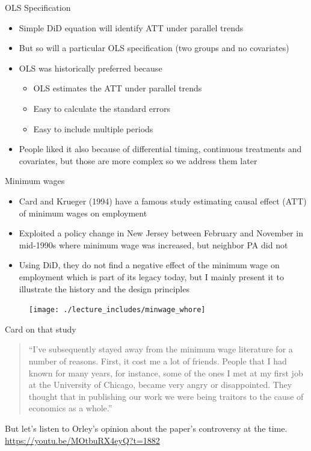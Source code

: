 \documentclass{beamer}
\begin{document}
\begin{frame}{OLS Specification}
	
	\begin{itemize}
	\item Simple DiD equation will identify ATT under parallel trends
	\item But so will a particular OLS specification (two groups and no covariates)
	\item OLS was historically preferred because
		\begin{itemize}
		\item OLS estimates the ATT under parallel trends
		\item Easy to calculate the standard errors
		\item Easy to include multiple periods
		\end{itemize}
	\item People liked it also because of differential timing, continuous treatments and covariates, but those are more complex so we address them later
	\end{itemize}
\end{frame}

\begin{frame}{Minimum wages}

\begin{itemize}
\item Card and Krueger (1994) have a famous study estimating causal effect (ATT) of minimum wages on employment
\item Exploited a policy change in New Jersey between February and November in mid-1990s where minimum wage was increased, but neighbor PA did not
\item Using DiD, they do not find a negative effect of the minimum wage on employment which is part of its legacy today, but I mainly present it to illustrate the history and the design principles
\end{itemize}

\end{frame}

\begin{frame}
	\begin{figure}
	\texttt{[image: ./lecture\_includes/minwage\_whore]}
	\end{figure}
\end{frame}

\begin{frame}{Card on that study}

\begin{quote}
``I’ve subsequently stayed away from the minimum wage literature for a number of reasons. First, it cost me a lot of friends. People that I had known for many years, for instance, some of the ones I met at my first job at the University of Chicago, became very angry or disappointed. They thought that in publishing our work we were being traitors to the cause of economics as a whole.''
\end{quote}

\bigskip

But let's listen to Orley's opinion about the paper's controversy at the time.  \url{https://youtu.be/MOtbuRX4eyQ?t=1882}

\end{frame}
\end{document}
